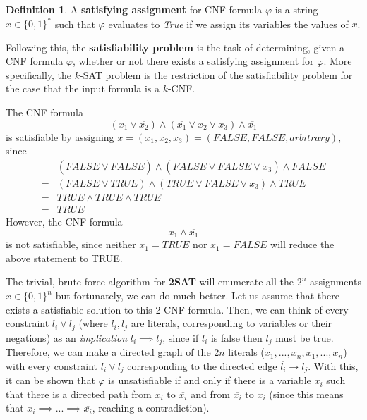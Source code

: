\documentclass[a4paper, 12pt]{report}
\theoremstyle{remark}
\theoremstyle{definition}
\newtheorem{definition}{Definition}[section]
\begin{document}
\begin{definition}
A \textbf{satisfying assignment} for CNF formula $\varphi$ is a string $x \in \{0,1\}^*$ such that $\varphi$ evaluates to \textit{True} if we assign its variables the values of $x$. 
\end{definition}

Following this, the \textbf{satisfiability problem} is the task of determining, given a CNF formula $\varphi$, whether or not there exists a satisfying assignment for $\varphi$. More specifically, the $k$-SAT problem is the restriction of the satisfiability problem for the case that the input formula is a $k$-CNF. 

\begin{example}
The CNF formula 
\[(x_1 \vee \overline{x_2}) \wedge (\overline{x_1} \vee x_2 \vee x_3) \wedge \overline{x_1}\]
is satisfiable by assigning $x = (x_1, x_2, x_3) = (FALSE, FALSE, arbitrary)$, since 
\begin{align*}
    & (FALSE \vee \overline{FALSE}) \wedge (\overline{FALSE} \vee FALSE \vee x_3) \wedge \overline{FALSE} \\
    = & (FALSE \vee TRUE) \wedge (TRUE \vee FALSE \vee x_3) \wedge TRUE \\
    = & TRUE \wedge TRUE \wedge TRUE \\
    = & TRUE
\end{align*}
However, the CNF formula 
\[x_1 \wedge \overline{x_1}\]
is not satisfiable, since neither $x_1 = TRUE$ nor $x_1 = FALSE$ will reduce the above statement to TRUE. 
\end{example}

The trivial, brute-force algorithm for \textbf{2SAT} will enumerate all the $2^n$ assignments $x \in \{0,1\}^n$ but fortunately, we can do much better. Let us assume that there exists a satisfiable solution to this 2-CNF formula. Then, we can think of every constraint $l_i \vee l_j$ (where $l_i, l_j$ are literals, corresponding to variables or their negations) as an \textit{implication} $\overline{l_i} \implies l_j$, since if $l_i$ is false then $l_j$ must be true. Therefore, we can make a directed graph of the $2n$ literals ($x_1, ..., x_n, \overline{x_1}, ..., \overline{x_n}$) with every constraint $l_i \vee l_j$ corresponding to the directed edge $\overline{l_i} \rightarrow l_j$. With this, it can be shown that $\varphi$ is unsatisfiable if and only if there is a variable $x_i$ such that there is a directed path from $x_i$ to $\overline{x_i}$ and from $\overline{x_i}$ to $x_i$ (since this means that $x_i \implies... \implies \overline{x_i}$, reaching a contradiction). 
\end{document}
